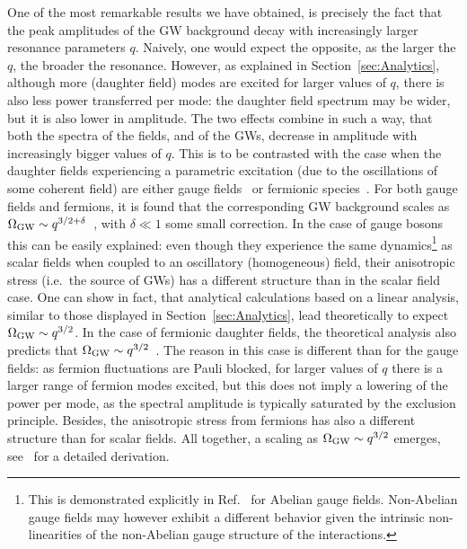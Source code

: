 \documentclass[a4paper,11pt]{article}
\begin{document}
One of the most remarkable results we have obtained, is precisely the fact that the peak amplitudes of the GW background decay with increasingly larger resonance parameters $q$. Naively, one would expect the opposite, as the larger the $q$, the broader the resonance. However, as explained in Section~\ref{sec:Analytics}, although more (daughter field) modes are excited for larger values of $q$, there is also less power transferred per mode: the daughter field spectrum may be wider, but it is also lower in amplitude. The two effects combine in such a way, that both the spectra of the fields, and of the GWs, decrease in amplitude with increasingly bigger values of $q$. This is to be contrasted with the case when the daughter fields experiencing a parametric excitation (due to the oscillations of some coherent field) are either gauge fields~\cite{Bezrukov:2008ut,GarciaBellido:2008ab,Bezrukov:2014ipa,Dufaux:2010cf,Deskins:2013lfx,Adshead:2015pva,Figueroa:2015rqa,Enqvist:2015sua,Lozanov:2016pac,Figueroa:2016dsc} or fermionic species~\cite{Greene:1998nh,Greene:2000ew,Peloso:2000hy,Berges:2010zv,Enqvist:2012im,Figueroa:2013vif,Figueroa:2014aya}. For both gauge fields and fermions, it is found that the corresponding GW background scales as $\Omega_{\rm GW} \sim q^{3/2 + \delta}$~\cite{Figueroa:2016ojl,Figueroa:2013vif,Figueroa:2014aya}, with $\delta \ll 1$ some small correction. In the case of gauge bosons this can be easily explained: even though they experience the same dynamics\footnote{This is demonstrated explicitly in Ref.~\cite{Figueroa:2015rqa} for Abelian gauge fields. Non-Abelian gauge fields may however exhibit a different behavior given the intrinsic non-linearities of the non-Abelian gauge structure of the interactions.} as scalar fields when coupled to an oscillatory (homogeneous) field, their anisotropic stress (i.e.~the source of GWs) has a different structure than in the scalar field case. One can show in fact, that analytical calculations based on a linear analysis, similar to those displayed in Section~\ref{sec:Analytics}, lead theoretically to expect $\Omega_{\rm GW} \sim q^{3/2}$. In the case of fermionic daughter fields, the theoretical analysis also predicts that $\Omega_{\rm GW} \sim q^{3/2}$~\cite{Figueroa:2013vif,Figueroa:2014aya}. The reason in this case is different than for the gauge fields: as fermion fluctuations are Pauli blocked, for larger values of $q$ there is a larger range of fermion modes excited, but this does not imply a lowering of the power per mode, as the spectral amplitude is typically saturated by the exclusion principle. Besides, the anisotropic stress from fermions has also a different structure than for scalar fields. All together, a scaling as $\Omega_{\rm GW} \sim q^{3/2}$ emerges, see~\cite{Figueroa:2013vif} for a detailed derivation.
\end{document}
